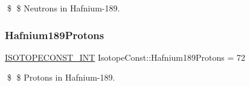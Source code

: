 \$ \$ Neutrons in Hafnium-\/189. \mbox{\label{group___isotope_const-_hafnium-_hf189_ga267e3015fcdee9813cf5cfc4f7dcdb2d}} 
\subsubsection{\texorpdfstring{Hafnium189\+Protons}{Hafnium189Protons}}
{\footnotesize\ttfamily \mbox{\hyperlink{group___isotope_const-_macros_ga5f18360b3e99483a35c32d789e62621c}{I\+S\+O\+T\+O\+P\+E\+C\+O\+N\+S\+T\+\_\+\+I\+NT}} Isotope\+Const\+::\+Hafnium189\+Protons = 72}

\$ \$ Protons in Hafnium-\/189. 
